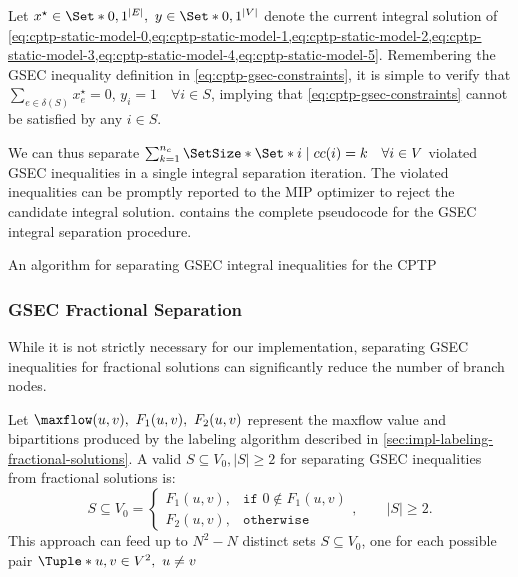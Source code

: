 Let $x^\star \in \Set*{0, 1}^{|E|},\ y \in \Set*{0, 1}^{|V|}$ denote the
current integral solution of
\cref{eq:cptp-static-model-0,eq:cptp-static-model-1,eq:cptp-static-model-2,eq:cptp-static-model-3,eq:cptp-static-model-4,eq:cptp-static-model-5}.
Remembering the GSEC inequality definition in \cref{eq:cptp-gsec-constraints},
it is simple to verify that
$\sum_{e \in \delta(S)} x^\star_{e} = 0$, $y_i =  1 \quad \forall i \in S$, implying that \cref{eq:cptp-gsec-constraints} cannot be satisfied by any $i \in S$.

\medskip

We can thus separate
$\sum^{n_c}_{k = 1} \SetSize*{ \Set*{ i \mid cc(i) = k \quad \forall i \in V } }$
violated GSEC inequalities in a single integral separation iteration.
The violated inequalities
can be promptly reported to the MIP optimizer to reject the candidate integral solution.
 contains the complete pseudocode for the GSEC integral separation procedure.

\begin{algorithm}
	\caption{An algorithm for separating GSEC integral inequalities for the CPTP}
	\label{algo:gsec-integral-sep}
	
\end{algorithm}

\subsubsection{GSEC Fractional Separation}
\label{sec:impl-gsec-fractional-separation}

While it is not strictly necessary for our implementation,
separating GSEC inequalities for fractional solutions can significantly reduce the number of branch nodes.

Let $\maxflow(u, v),\ F_1(u, v),\ F_2(u, v)$ represent the maxflow value and bipartitions
produced by the labeling algorithm described in \cref{sec:impl-labeling-fractional-solutions}.
A valid $S \subseteq V_0, |S| \ge 2$ for separating GSEC inequalities from fractional solutions is:
\begin{equation}
	S \subseteq V_0 =
	\begin{cases}
		F_1(u, v), & \texttt{if } 0 \notin F_1(u, v) \\
		F_2(u, v), & \texttt{otherwise}
	\end{cases},
	\qquad
	|S| \ge 2.
\end{equation}
This approach can feed up to
$N^2 - N$ distinct sets $S \subseteq V_0$,
one for each possible pair $\Tuple*{u, v} \in V^2,\ u \ne v$

